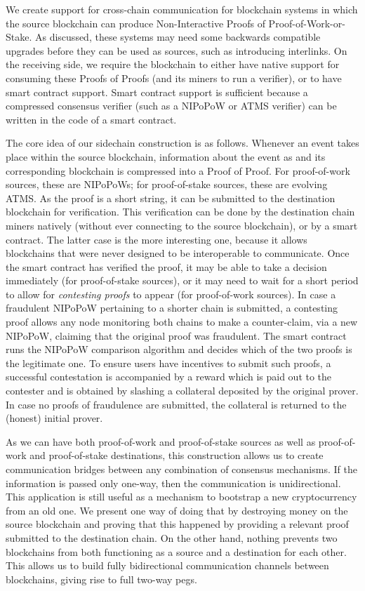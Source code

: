 We create support for cross-chain communication for blockchain systems in which
the source blockchain can produce Non-Interactive Proofs of
Proof-of-Work-or-Stake. As discussed, these systems may need some backwards
compatible upgrades before they can be used as sources, such as introducing
interlinks. On the receiving side, we require the blockchain to either have
native support for consuming these Proofs of Proofs (and its miners to run a
verifier), or to have smart contract support. Smart contract support is
sufficient because a compressed consensus verifier (such as a NIPoPoW or ATMS
verifier) can be written in the code of a smart contract.

The core idea of our sidechain construction is as follows. Whenever an event
takes place within the source blockchain, information about the event as and its
corresponding blockchain is compressed into a Proof of Proof. For proof-of-work
sources, these are NIPoPoWs; for proof-of-stake sources, these are evolving
ATMS. As the proof is a short string, it can be submitted to the destination
blockchain for verification. This verification can be done by the destination
chain miners natively (without ever connecting to the source blockchain), or by
a smart contract. The latter case is the more interesting one, because it allows
blockchains that were never designed to be interoperable to communicate. Once
the smart contract has verified the proof, it may be able to take a decision
immediately (for proof-of-stake sources), or it may need to wait for a short
period to allow for \emph{contesting proofs} to appear (for proof-of-work
sources). In case a fraudulent NIPoPoW pertaining to a shorter chain is
submitted, a contesting proof allows any node monitoring both chains to make
a counter-claim, via a new NIPoPoW, claiming that the original proof was
fraudulent. The smart contract runs the NIPoPoW comparison algorithm and decides
which of the two proofs is the legitimate one. To ensure users have incentives
to submit such proofs, a successful contestation is accompanied by a reward
which is paid out to the contester and is obtained by slashing a collateral
deposited by the original prover. In case no proofs of fraudulence are
submitted, the collateral is returned to the (honest) initial prover.

As we can have both proof-of-work and proof-of-stake sources as well as
proof-of-work and proof-of-stake destinations, this construction allows us to
create communication bridges between any combination of consensus mechanisms.
If the information is passed only one-way, then the communication is
unidirectional. This application is still useful as a mechanism to bootstrap a
new cryptocurrency from an old one. We present one way of doing that by
destroying money on the source blockchain and proving that this happened by
providing a relevant proof submitted to the destination chain. On the other
hand, nothing prevents two blockchains from both functioning as a source and a
destination for each other. This allows us to build fully bidirectional
communication channels between blockchains, giving rise to full two-way pegs.

